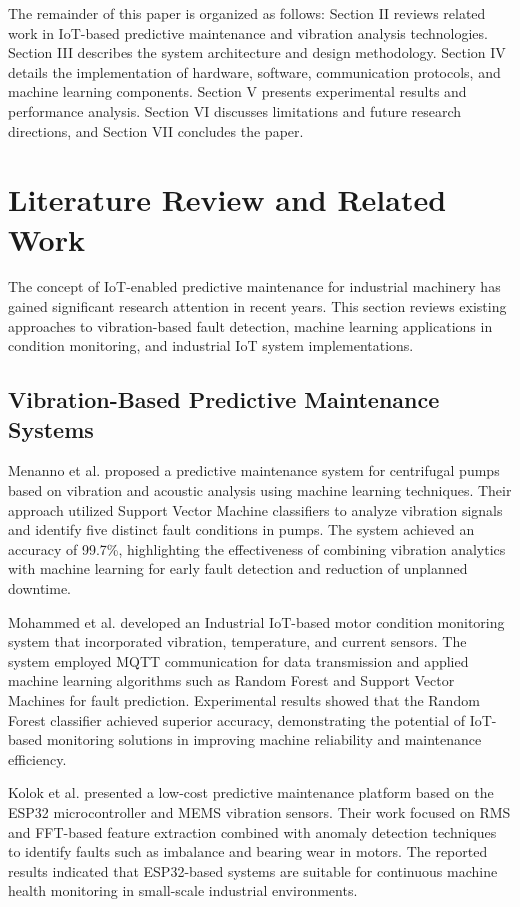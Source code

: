\documentclass[conference]{IEEEtran}
\begin{document}
The remainder of this paper is organized as follows: Section II reviews related work in IoT-based predictive maintenance and vibration analysis technologies. Section III describes the system architecture and design methodology. Section IV details the implementation of hardware, software, communication protocols, and machine learning components. Section V presents experimental results and performance analysis. Section VI discusses limitations and future research directions, and Section VII concludes the paper.

\section{Literature Review and Related Work}
The concept of IoT-enabled predictive maintenance for industrial machinery has gained significant research attention in recent years. This section reviews existing approaches to vibration-based fault detection, machine learning applications in condition monitoring, and industrial IoT system implementations.

\subsection{Vibration-Based Predictive Maintenance Systems}

Menanno et al. \cite{menanno2023} proposed a predictive maintenance system for centrifugal pumps based on vibration and acoustic analysis using machine learning techniques. Their approach utilized Support Vector Machine classifiers to analyze vibration signals and identify five distinct fault conditions in pumps. The system achieved an accuracy of 99.7\%, highlighting the effectiveness of combining vibration analytics with machine learning for early fault detection and reduction of unplanned downtime.

Mohammed et al. \cite{mohammed2023} developed an Industrial IoT-based motor condition monitoring system that incorporated vibration, temperature, and current sensors. The system employed MQTT communication for data transmission and applied machine learning algorithms such as Random Forest and Support Vector Machines for fault prediction. Experimental results showed that the Random Forest classifier achieved superior accuracy, demonstrating the potential of IoT-based monitoring solutions in improving machine reliability and maintenance efficiency.

Kolok et al. \cite{kolok2025} presented a low-cost predictive maintenance platform based on the ESP32 microcontroller and MEMS vibration sensors. Their work focused on RMS and FFT-based feature extraction combined with anomaly detection techniques to identify faults such as imbalance and bearing wear in motors. The reported results indicated that ESP32-based systems are suitable for continuous machine health monitoring in small-scale industrial environments.
\end{document}

